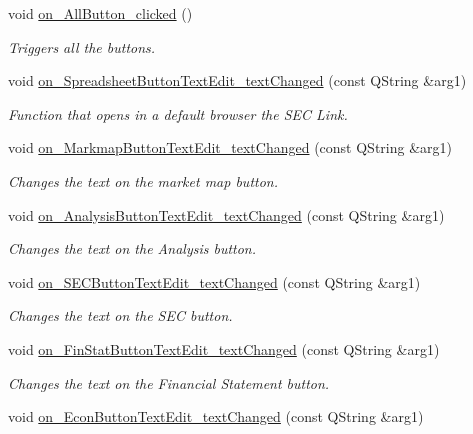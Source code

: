 \begin{DoxyCompactItemize}
void \hyperlink{class_t_k_r_t_a_p_ac34089a7673199ae27b6cbc3e4f20ffe}{on\+\_\+\+All\+Button\+\_\+clicked} ()
\begin{DoxyCompactList}\small\item\em Triggers all the buttons. \end{DoxyCompactList}\item 
void \hyperlink{class_t_k_r_t_a_p_aea76795d49f0ce78a0f1ddf1bd47cd75}{on\+\_\+\+Spreadsheet\+Button\+Text\+Edit\+\_\+text\+Changed} (const Q\+String \&arg1)
\begin{DoxyCompactList}\small\item\em Function that opens in a default browser the S\+E\+C Link. \end{DoxyCompactList}\item 
void \hyperlink{class_t_k_r_t_a_p_aa01ac37701db845187a9462e703d089f}{on\+\_\+\+Markmap\+Button\+Text\+Edit\+\_\+text\+Changed} (const Q\+String \&arg1)
\begin{DoxyCompactList}\small\item\em Changes the text on the market map button. \end{DoxyCompactList}\item 
void \hyperlink{class_t_k_r_t_a_p_a52aeb4ceba84acce2a98e8e059eeed9f}{on\+\_\+\+Analysis\+Button\+Text\+Edit\+\_\+text\+Changed} (const Q\+String \&arg1)
\begin{DoxyCompactList}\small\item\em Changes the text on the Analysis button. \end{DoxyCompactList}\item 
void \hyperlink{class_t_k_r_t_a_p_a13ba09fe615e6ea1a8aede0589b79bce}{on\+\_\+\+S\+E\+C\+Button\+Text\+Edit\+\_\+text\+Changed} (const Q\+String \&arg1)
\begin{DoxyCompactList}\small\item\em Changes the text on the S\+E\+C button. \end{DoxyCompactList}\item 
void \hyperlink{class_t_k_r_t_a_p_ab614bb00b5d68ea8ddb0c87a028c9687}{on\+\_\+\+Fin\+Stat\+Button\+Text\+Edit\+\_\+text\+Changed} (const Q\+String \&arg1)
\begin{DoxyCompactList}\small\item\em Changes the text on the Financial Statement button. \end{DoxyCompactList}\item 
void \hyperlink{class_t_k_r_t_a_p_a13c4a949a02a82b73639292611392f03}{on\+\_\+\+Econ\+Button\+Text\+Edit\+\_\+text\+Changed} (const Q\+String \&arg1)

\end{DoxyCompactItemize}
